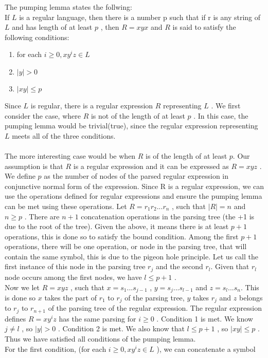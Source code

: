 \documentclass{report}
\newcommand{\me}[1]{
\begin{math}
#1
\end{math}
}
\begin{document}
The pumping lemma states the follwing: \\
If \me{L} is a regular language, then there is a number p such that if r is any string of \me{L} and has length of at least \me{p}, then  \me{R=xyx} and \me{R} is said to satisfy the following conditions:
\begin{enumerate}
  \item for each \me{i \geq 0, xy^i z \in L} 
  \item \me{|y| > 0}
  \item \me{|xy| \leq p}
\end{enumerate}


Since \me{L} is regular, there is a regular expression \me{R} representing \me{L}. We first consider the case, where \me{R} is not of the length of at least \me{p}. In this case, the pumping lemma would be trivial(true), since the regular expression representing \me{L} meets all of the three conditions. 
\\ \\
 The more interesting case would be when \me{R} is of the length of at least \me{p.} Our assumption is that \me{R} is a regular expression and it can be expressed as \me{R = xyz}. We define \me{p} as the number of nodes of the parsed regular expression in conjunctive normal form of the expression. Since R is a regular expression, we can use the operations defined for regular expressions and ensure the pumping lemma can be met using these operations. Let \me{R = r_1r_2...r_n}, such that \me{|R| = n} and \me{n \geq p}. There are\me{n+1} concatenation operations in the parsing tree (the +1 is due to the root of the tree). Given the above, it means there is at least \me{p+1} operations, this is done so to satisfy the bound condition. Among the first \me{p+1} operations, there will be one operation, or node in the parsing  tree, that will contain the same symbol, this is due to the pigeon hole principle. Let us call the first instance of this node in the parsing tree \me{r_j} and the  second \me{r_l.} Given that \me{r_l} node occurs among the first nodes, we have \me{l \leq p+1}. \\
 
 Now we let \me{R =xyz}, such that \me{x=s_1...s_{j-1}} , \me{y=s_j...s_{l-1}} and \me{z=s_l ...s_n.} This is done so\me{ x} takes the part of \me{r_1} to \me{r_j} of the parsing tree, \me{y} takes \me{r_j} and \me{z} belongs to \me{r_j} to \me{r_{n+1}}  of the parsing tree of the regular expression. The regular expression defines \me{R=xy^iz} has the same parsing for \me{i \geq 0}. Condition 1 is met. We know \me{j \neq l}, so \me{|y| > 0}. Condition 2 is met. We also know that \me{l \leq p+1}, so \me{|xy| \leq p}. Thus we have satisfied all conditions of the pumping lemma.
\ \ \\
For the first condition,  (for each \me{i \geq 0, xy^iz \in L}), we can concatenate a symbol 
	


\end{document}
